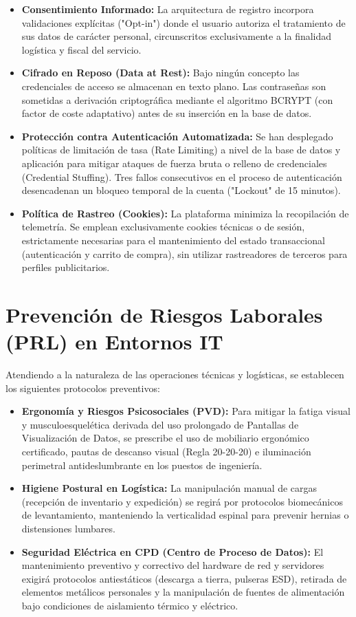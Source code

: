 \documentclass[12pt,a4paper]{article}
\begin{document}
\begin{itemize}
    \item \textbf{Consentimiento Informado:} La arquitectura de registro incorpora validaciones explícitas ("Opt-in") donde el usuario autoriza el tratamiento de sus datos de carácter personal, circunscritos exclusivamente a la finalidad logística y fiscal del servicio.
    \item \textbf{Cifrado en Reposo (Data at Rest):} Bajo ningún concepto las credenciales de acceso se almacenan en texto plano. Las contraseñas son sometidas a derivación criptográfica mediante el algoritmo BCRYPT (con factor de coste adaptativo) antes de su inserción en la base de datos.
    \item \textbf{Protección contra Autenticación Automatizada:} Se han desplegado políticas de limitación de tasa (Rate Limiting) a nivel de la base de datos y aplicación para mitigar ataques de fuerza bruta o relleno de credenciales (Credential Stuffing). Tres fallos consecutivos en el proceso de autenticación desencadenan un bloqueo temporal de la cuenta ("Lockout" de 15 minutos).
    \item \textbf{Política de Rastreo (Cookies):} La plataforma minimiza la recopilación de telemetría. Se emplean exclusivamente cookies técnicas o de sesión, estrictamente necesarias para el mantenimiento del estado transaccional (autenticación y carrito de compra), sin utilizar rastreadores de terceros para perfiles publicitarios.
\end{itemize}

\newpage
\section{Prevención de Riesgos Laborales (PRL) en Entornos IT}
\label{PRL}

Atendiendo a la naturaleza de las operaciones técnicas y logísticas, se establecen los siguientes protocolos preventivos:

\begin{itemize}
    \item \textbf{Ergonomía y Riesgos Psicosociales (PVD):} Para mitigar la fatiga visual y musculoesquelética derivada del uso prolongado de Pantallas de Visualización de Datos, se prescribe el uso de mobiliario ergonómico certificado, pautas de descanso visual (Regla 20-20-20) e iluminación perimetral antideslumbrante en los puestos de ingeniería.
    \item \textbf{Higiene Postural en Logística:} La manipulación manual de cargas (recepción de inventario y expedición) se regirá por protocolos biomecánicos de levantamiento, manteniendo la verticalidad espinal para prevenir hernias o distensiones lumbares.
    \item \textbf{Seguridad Eléctrica en CPD (Centro de Proceso de Datos):} El mantenimiento preventivo y correctivo del hardware de red y servidores exigirá protocolos antiestáticos (descarga a tierra, pulseras ESD), retirada de elementos metálicos personales y la manipulación de fuentes de alimentación bajo condiciones de aislamiento térmico y eléctrico.
\end{itemize}
\end{document}
